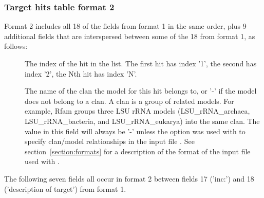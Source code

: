 \subsubsection{Target hits table format 2}
\label{tabular-format2}

Format 2 includes all 18 of the fields from format 1 in the same order, plus 9
additional fields that are interspersed between some of the 18 from
format 1, as follows:

\begin{description}

\item[] 
  The index of the hit in the list. The first hit has index '1', the
  second has index '2', the Nth hit has index 'N'.

\item[] 
  The name of the clan the model for this hit belongs to, or '-' if
  the model does not belong to a clan. A clan is a group of related
  models. For example, Rfam groups three LSU rRNA models
  (LSU\_rRNA\_archaea, LSU\_rRNA\_bacteria, and LSU\_rRNA\_eukarya)
  into the same clan. The value in this field will always be '-'
  unless the  option was used with
   to specify clan/model relationships in the input file
  . See section~\ref{section:formats} for a description of
  the format of the input file used with .

\end{description}

The following seven fields all occur in format 2 between fields 17
('inc:') and 18 ('description of target') from format 1. 

